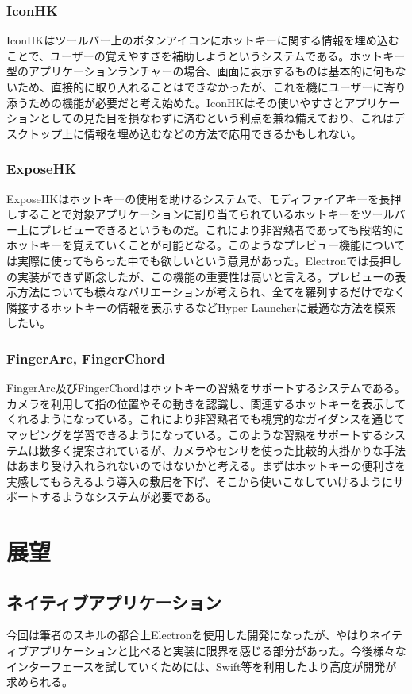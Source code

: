 \subsubsection{IconHK}
IconHK\cite{iconhk}はツールバー上のボタンアイコンにホットキーに関する情報を埋め込むことで、ユーザーの覚えやすさを補助しようというシステムである。ホットキー型のアプリケーションランチャーの場合、画面に表示するものは基本的に何もないため、直接的に取り入れることはできなかったが、これを機にユーザーに寄り添うための機能が必要だと考え始めた。IconHKはその使いやすさとアプリケーションとしての見た目を損なわずに済むという利点を兼ね備えており、これはデスクトップ上に情報を埋め込むなどの方法で応用できるかもしれない。

\subsubsection{ExposeHK}
ExposeHK\cite{exposehk}はホットキーの使用を助けるシステムで、モディファイアキーを長押しすることで対象アプリケーションに割り当てられているホットキーをツールバー上にプレビューできるというものだ。これにより非習熟者であっても段階的にホットキーを覚えていくことが可能となる。このようなプレビュー機能については実際に使ってもらった中でも欲しいという意見があった。Electronでは長押しの実装ができず断念したが、この機能の重要性は高いと言える。プレビューの表示方法についても様々なバリエーションが考えられ、全てを羅列するだけでなく隣接するホットキーの情報を表示するなどHyper Launcherに最適な方法を模索したい。

\subsubsection{FingerArc, FingerChord}
FingerArc及びFingerChord\cite{fingerarcandfinderchord}はホットキーの習熟をサポートするシステムである。カメラを利用して指の位置やその動きを認識し、関連するホットキーを表示してくれるようになっている。これにより非習熟者でも視覚的なガイダンスを通じてマッピングを学習できるようになっている。このような習熟をサポートするシステムは数多く提案されているが、カメラやセンサを使った比較的大掛かりな手法はあまり受け入れられないのではないかと考える。まずはホットキーの便利さを実感してもらえるよう導入の敷居を下げ、そこから使いこなしていけるようにサポートするようなシステムが必要である。


\section{展望}

\subsection{ネイティブアプリケーション}
今回は筆者のスキルの都合上Electronを使用した開発になったが、やはりネイティブアプリケーションと比べると実装に限界を感じる部分があった。今後様々なインターフェースを試していくためには、Swift等を利用したより高度が開発が求められる。

